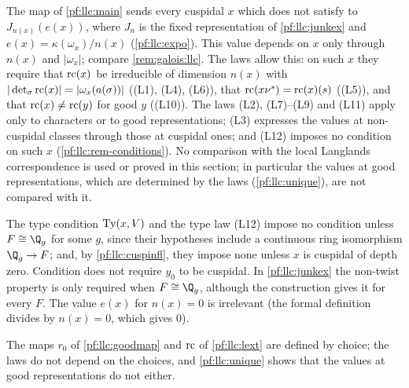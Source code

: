\begin{remark}\label{pf:llc:rem-values}
The map of \cref{pf:llc:main} sends every cuspidal $x$ which does not satisfy \llcGo{} to $J_{n(x)}(e(x))$, where $J_n$ is
the fixed representation of \cref{pf:llc:junkex} and $e(x)=\kappa(\omega_x)/n(x)$ (\cref{pf:llc:expo}). This value depends on
$x$ only through $n(x)$ and $|\omega_x|$; compare \cref{rem:galois:llc}. The laws allow this: on such $x$ they require that
$\mathrm{rc}(x)$ be irreducible of dimension $n(x)$ with $|\det_\sigma\mathrm{rc}(x)|=|\omega_x(a(\sigma))|$ ((L1), (L4), (L6)), that
$\mathrm{rc}(x\nu^s)=\mathrm{rc}(x)(s)$ ((L5)), and that $\mathrm{rc}(x)\ne\mathrm{rc}(y)$ for good $y$ ((L10)). The laws (L2), (L7)--(L9) and (L11)
apply only to characters or to good representations; (L3) expresses the values at non-cuspidal classes through those at cuspidal
ones; and (L12) imposes no condition on such $x$ (\cref{pf:llc:rem-conditions}). No comparison with the local Langlands
correspondence is used or proved in this section; in particular the values at good representations, which are
determined by the laws (\cref{pf:llc:unique}), are not compared with it.
\end{remark}

\begin{remark}\label{pf:llc:rem-conditions}
The type condition $\operatorname{Ty}(x,V)$ and the type law (L12) impose no condition unless $F\cong\Q_g$ for some $g$, since their
hypotheses include a continuous ring isomorphism $\Q_g\to F$; and, by \cref{pf:llc:cuspinfl}, they impose none unless $x$ is
cuspidal of depth zero. Condition
\llcGo{} does not require $y_0$ to be cuspidal. In \cref{pf:llc:junkex} the non-twist property is only required when
$F\cong\Q_g$, although the construction gives it for every $F$. The value $e(x)$ for $n(x)=0$ is irrelevant (the formal
definition divides by $n(x)=0$, which gives $0$).
\end{remark}

\begin{remark}\label{pf:llc:rem-choice}
The maps $r_0$ of \cref{pf:llc:goodmap} and $\mathrm{rc}$ of \cref{pf:llc:lext} are defined by choice; the laws do not depend on the
choices, and \cref{pf:llc:unique} shows that the values at good representations do not either.
\end{remark}
